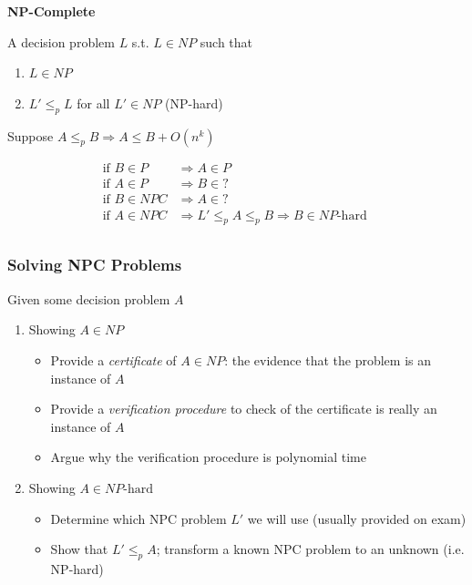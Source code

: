 \documentclass[../notes.tex]{subfiles}
\begin{document}
\begin{definition}
	\textbf{NP-Complete}

	A decision problem $ L $ s.t. $ L \in NP $ such that

	\begin{enumerate}
		\item $ L \in NP $
		\item $ L' \le_p L $ for all $ L'  \in NP $ (NP-hard)
	\end{enumerate}

	Suppose $ A \leq_p B \Rightarrow A \leq B + O(n^k) $

\begin{equation}
	\begin{split}
		\text{if } B \in P & \Rightarrow A \in P  \\
		\text{if } A \in P & \Rightarrow B \in ?  \\
		\text{if } B \in NPC & \Rightarrow A \in ?  \\
		\text{if } A \in NPC & \Rightarrow L' \le_p A \le_p B \Rightarrow B \in NP\text{-hard } \\
	\end{split}
\end{equation}


\end{definition}

\subsubsection{Solving NPC Problems}

Given some decision problem $ A $
\begin{enumerate}
	\item Showing $ A \in NP$
		\begin{itemize}
			\item Provide a \textit{certificate} of $ A \in NP $: the evidence that the problem is an instance of $ A $
			\item Provide a \textit{verification procedure} to check of the certificate is really an instance of $ A $
			\item Argue why the verification procedure is polynomial time
		\end{itemize}
	\item Showing $ A \in NP\text{-hard} $
		\begin{itemize}
			\item Determine which NPC problem $ L' $ we will use (usually provided on exam)
			\item Show that $ L' \le_p A$; transform a known NPC problem to an unknown (i.e. NP-hard)
		\end{itemize}
\end{enumerate}
\end{document}
